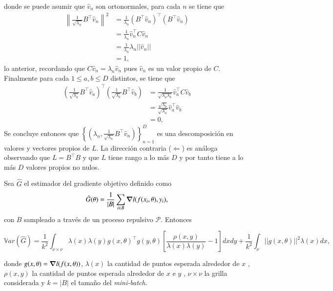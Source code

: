 \begin{appendixs}
    donde se puede asumir que $\hat{v}_n$ son ortonormales, para cada $n$ se tiene que 
    \begin{align*}
    \left\| \frac{1}{\sqrt{\lambda_n}}B^{\top}\hat{v}_n \right\|^2 &= \frac{1}{\lambda_n}(B^{\top}\hat{v}_n)^{\top}(B^{\top}\hat{v}_n) \\
    &= \frac{1}{\lambda_n}\hat{v}^{\top}_n C \hat{v}_n \\
    &= \frac{1}{\lambda_n}\lambda_n ||\hat{v}_n|| \\
    &= 1 , 
    \end{align*}
    lo anterior, recordando que $C\hat{v}_n = \lambda_n\hat{v}_n$ pues $\hat{v}_n$ es un valor propio de $C$. Finalmente para cada $1 \leq a,b \leq D$ distintos, se tiene que 
    \begin{align*}
    \left ( \frac{1}{\sqrt{\lambda_a}}B^{\top}\hat{v}_a \right )^{\top}\left( \frac{1}{\sqrt{\lambda_b}}B^{\top}\hat{v}_b \right ) &= \frac{1}{\sqrt{\lambda_a\lambda_b}}\hat{v}^{\top}_aC\hat{v}_b \\
    &= \frac{\sqrt{\lambda_b}}{\sqrt{\lambda_a}}\hat{v}^{\top}_a\hat{v}_b \\
    &= 0 , 
    \end{align*}
    Se concluye entonces que $\left \{ \left (\lambda_n , \frac{1}{\sqrt{\lambda_n}}B^{\top}\hat{v}_n \right )\right \}_{n=1}^D$ es una descomposición en valores y vectores propios de $L$. La dirección contraria ($\Leftarrow$) es análoga observando que $L = B^{\top}B$ y que $L$ tiene rango a lo más $D$ y por tanto tiene a lo más $D$ valores propios no nulos.
    
    \begin{teo}\hypertarget{Teorema .4}{}
    Sea $\hat{G}$ el estimador del gradiente objetivo definido como 
    \[
    \hat{G}(\theta) = \frac{1}{|B|}\sum_{i \in B}\grad l(f(x_i , \theta),y_i) , 
    \]
    con $B$ sampleado a través de un proceso repulsivo $\mathcal{P}$. Entonces 
    
    \[
        \mathbb{V}ar(\hat{G}) = \frac{1}{k^2}\int_{\nu \times \nu}\lambda(x)\lambda(y)g(x,\theta)^{\top}g(y,\theta)\left [ \frac{\rho(x,y)}{\lambda(x)\lambda(y)} - 1\right ]dxdy
        + \frac{1}{k^2} \int_{\nu} ||g(x,\theta)||^2\lambda(x)dx , 
    \]
    
    donde $g(x,\theta) = \grad l(f(x, \theta))$, $\lambda(x)$ la cantidad de puntos esperada alrededor de $x$ , $\rho(x,y)$ la cantidad de puntos esperada alrededor de $x$ e $y$ , $\nu \times \nu$ la grilla considerada y $k = |B|$ el tamaño del \textit{mini-batch}. 
    \end{teo}
    

\end{appendixs}
